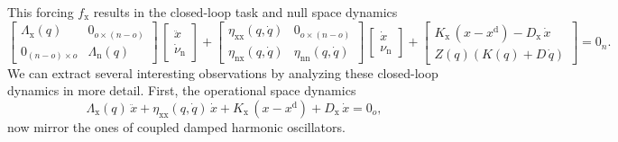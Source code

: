 This forcing $f_\mathrm{x}$ results in the closed-loop task and null space dynamics
\begin{equation}
    \begin{bmatrix}
        \Lambda_\mathrm{x}(q) & 0_{o \times (n-o)}\\
        0_{(n-o) \times o} & \Lambda_\mathrm{n}(q)
    \end{bmatrix} \, \begin{bmatrix}
        \ddot{x}\\
        \dot{\nu}_\mathrm{n}
    \end{bmatrix} + \begin{bmatrix}
        \eta_\mathrm{xx}(q,\dot{q}) & 0_{o \times (n-o)}\\
        \eta_\mathrm{nx}(q,\dot{q}) & \eta_\mathrm{nn}(q,\dot{q})
    \end{bmatrix} \, \begin{bmatrix}
        \dot{x}\\ \nu_\mathrm{n}
    \end{bmatrix} + \begin{bmatrix}
        K_\mathrm{x} \, (x - x^\mathrm{d}) - D_\mathrm{x} \, \dot{x}\\
        Z(q) \left ( K(q) + D \, \dot{q} \right )
    \end{bmatrix} = 0_{n}.
\end{equation}
We can extract several interesting observations by analyzing these closed-loop dynamics in more detail. First, the operational space dynamics
\begin{equation}
    \Lambda_\mathrm{x}(q) \, \ddot{x} + \eta_\mathrm{xx}(q,\dot{q}) \, \dot{x} + K_\mathrm{x} \, (x - x^\mathrm{d}) + D_\mathrm{x} \, \dot{x} = 0_{o},
\end{equation}
now mirror the ones of coupled damped harmonic oscillators.
